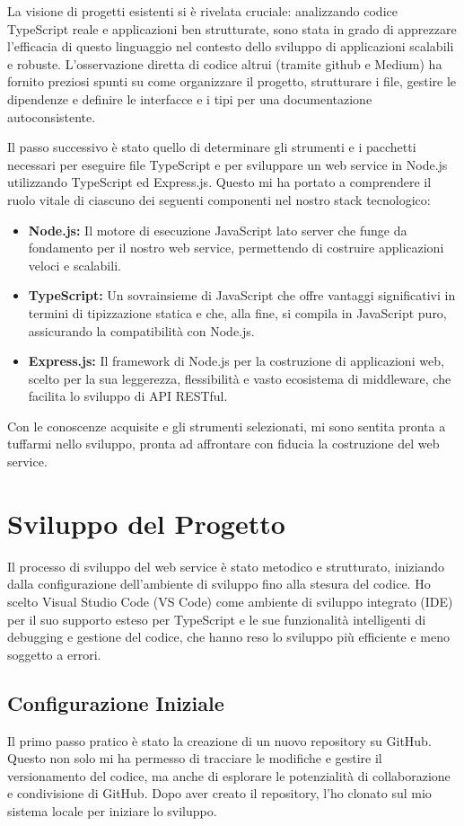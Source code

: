 \documentclass[12pt]{article}
\begin{document}
La visione di progetti esistenti si è rivelata cruciale: analizzando codice TypeScript reale e applicazioni ben strutturate, sono stata in grado di apprezzare l'efficacia di questo linguaggio nel contesto dello sviluppo di applicazioni scalabili e robuste. L'osservazione diretta di codice altrui (tramite github e Medium) ha fornito preziosi spunti su come organizzare il progetto, strutturare i file, gestire le dipendenze e definire le interfacce e i tipi per una documentazione autoconsistente.

Il passo successivo è stato quello di determinare gli strumenti e i pacchetti necessari per eseguire file TypeScript e per sviluppare un web service in Node.js utilizzando TypeScript ed Express.js. Questo mi ha portato a comprendere il ruolo vitale di ciascuno dei seguenti componenti nel nostro stack tecnologico:

\begin{itemize}
\item \textbf{Node.js:} Il motore di esecuzione JavaScript lato server che funge da fondamento per il nostro web service, permettendo di costruire applicazioni veloci e scalabili.
\item \textbf{TypeScript:} Un sovrainsieme di JavaScript che offre vantaggi significativi in termini di tipizzazione statica e che, alla fine, si compila in JavaScript puro, assicurando la compatibilità con Node.js.
\item \textbf{Express.js:} Il framework di Node.js per la costruzione di applicazioni web, scelto per la sua leggerezza, flessibilità e vasto ecosistema di middleware, che facilita lo sviluppo di API RESTful.

\end{itemize}
Con le conoscenze acquisite e gli strumenti selezionati, mi sono sentita pronta a tuffarmi nello sviluppo, pronta ad affrontare con fiducia la costruzione del web service.
\section{Sviluppo del Progetto}

Il processo di sviluppo del web service è stato metodico e strutturato, iniziando dalla configurazione dell'ambiente di sviluppo fino alla stesura del codice. Ho scelto Visual Studio Code (VS Code) come ambiente di sviluppo integrato (IDE) per il suo supporto esteso per TypeScript e le sue funzionalità intelligenti di debugging e gestione del codice, che hanno reso lo sviluppo più efficiente e meno soggetto a errori.
\subsection{Configurazione Iniziale}
Il primo passo pratico è stato la creazione di un nuovo repository su GitHub. Questo non solo mi ha permesso di tracciare le modifiche e gestire il versionamento del codice, ma anche di esplorare le potenzialità di collaborazione e condivisione di GitHub. Dopo aver creato il repository, l'ho clonato sul mio sistema locale per iniziare lo sviluppo.
\end{document}
